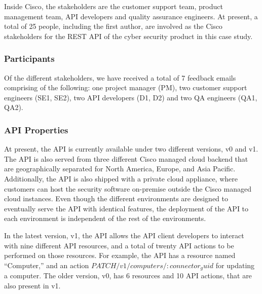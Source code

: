 \documentclass[10pt, conference]{IEEEtran}
\begin{document}
Inside Cisco, the stakeholders are the customer support team, product management team, API developers and quality assurance engineers. At present, a total of 25 people, including the first author, are involved as the Cisco stakeholders for the REST API of the cyber security product in this case study.

\subsubsection{Participants}
Of the different stakeholders, we have received a total of 7 feedback emails comprising of the following: one project manager (PM), two customer support engineers (SE1, SE2), two API developers (D1, D2) and two QA engineers (QA1, QA2).

\subsubsection{API Properties} %
At present, the API is currently available under two different versions, v0 and v1. The API is also served from three different Cisco managed cloud backend that are geographically separated for North America, Europe, and Asia Pacific. Additionally, the API is also shipped with a private cloud appliance, where customers can host the security software on-premise outside the Cisco managed cloud instances. Even though the different environments are designed to eventually serve the API with identical features, the deployment of the API to each environment is independent of the rest of the environments.

In the latest version, v1, the API allows the API client developers to interact with nine different API resources, and a total of twenty API actions to be performed on those resources. For example, the API has a resource named ``Computer,'' and an action $PATCH /v1/computers/{:connector_guid}$ for updating a computer. The older version, v0, has 6 resources and 10 API actions, that are also present in v1.
\end{document}
